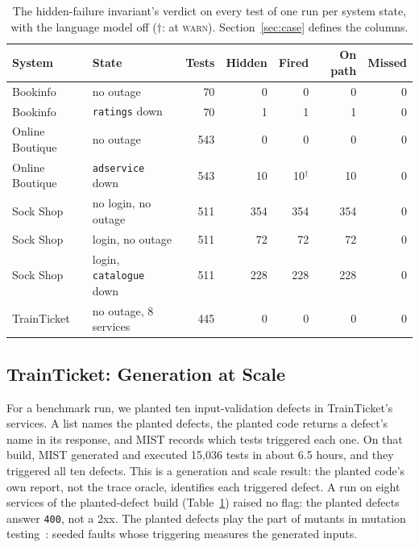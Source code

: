 \documentclass[10pt,conference]{IEEEtran}
\begin{document}
\begin{table}[t]
\centering
\caption{The hidden-failure invariant's verdict on every test of one run per system state, with the language model off ($\dagger$: at \textsc{warn}). Section~\ref{sec:case} defines the columns.}
\label{tab:verdicts}
\scriptsize\setlength{\tabcolsep}{2.5pt}
\begin{tabular}{@{}llrrrrr@{}}
\toprule
\textbf{System} & \textbf{State} & \textbf{Tests} & \textbf{Hidden} & \textbf{Fired} & \textbf{On path} & \textbf{Missed} \\
\midrule
Bookinfo        & no outage               &  70 &   0 &   0 &   0 & 0 \\
Bookinfo        & \texttt{ratings} down   &  70 &   1 &   1 &   1 & 0 \\
Online Boutique & no outage               & 543 &   0 &   0 &   0 & 0 \\
Online Boutique & \texttt{adservice} down & 543 &  10 &  10$^{\dagger}$ &  10 & 0 \\
Sock Shop       & no login, no outage     & 511 & 354 & 354 & 354 & 0 \\
Sock Shop       & login, no outage        & 511 &  72 &  72 &  72 & 0 \\
Sock Shop       & login, \texttt{catalogue} down & 511 & 228 & 228 & 228 & 0 \\
TrainTicket     & no outage, 8 services   & 445 &   0 &   0 &   0 & 0 \\
\bottomrule
\end{tabular}
\end{table}

\subsection{TrainTicket: Generation at Scale}

For a benchmark run, we planted ten input-validation defects in TrainTicket's services. A list names the planted defects, the planted code returns a defect's name in its response, and MIST records which tests triggered each one. On that build, MIST generated and executed 15,036 tests in about 6.5 hours, and they triggered all ten defects. This is a generation and scale result: the planted code's own report, not the trace oracle, identifies each triggered defect. A run on eight services of the planted-defect build (Table~\ref{tab:verdicts}) raised no flag: the planted defects answer \texttt{400}, not a 2xx. The planted defects play the part of mutants in mutation testing~\cite{Jia2011MutationSurvey}: seeded faults whose triggering measures the generated inputs.
\end{document}
